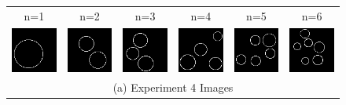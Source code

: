 \documentclass[letterpaper]{article} %
\begin{document}
\begin{figure}[!htbp]%
\centering
\footnotesize
\begin{tabular}{cccccc}
\multicolumn{1}{c}{n=1} \hspace{-12pt} &
\multicolumn{1}{c}{n=2} \hspace{-12pt} &
\multicolumn{1}{c}{n=3} \hspace{-12pt} &
\multicolumn{1}{c}{n=4} \hspace{-12pt} &
\multicolumn{1}{c}{n=5} \hspace{-12pt} &
\multicolumn{1}{c}{n=6} \\

\multicolumn{1}{c}{\includegraphics[width=0.125\columnwidth]{images/ring_1.png}} \hspace{-12pt} &  \multicolumn{1}{c}{\includegraphics[width=0.125\columnwidth]{images/ring_2.png}} \hspace{-12pt} & \multicolumn{1}{c}{\includegraphics[width=0.125\columnwidth]{images/ring_3.png}} \hspace{-12pt} & \multicolumn{1}{c}{\includegraphics[width=0.125\columnwidth]{images/ring_4.png}} \hspace{-12pt} & \multicolumn{1}{c}{\includegraphics[width=0.125\columnwidth]{images/ring_5.png}} \hspace{-12pt} & \multicolumn{1}{c}{\includegraphics[width=0.125\columnwidth]{images/ring_6.png}} \\
\multicolumn{6}{c}{(a) Experiment 4 Images} \\


\end{tabular}
\end{figure}
\end{document}
